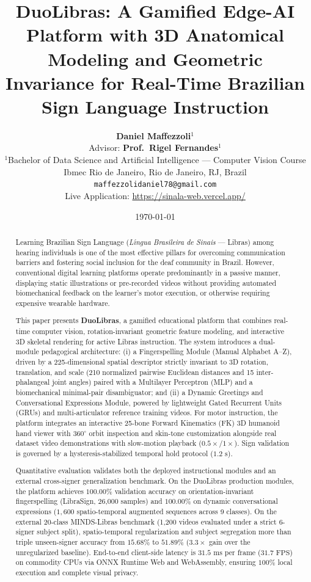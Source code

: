 \documentclass[12pt,a4paper]{article}
\title{%
\textbf{DuoLibras: A Gamified Edge-AI Platform with 3D Anatomical Modeling and Geometric Invariance for Real-Time Brazilian Sign Language Instruction}%
}
\author{%
    \textbf{Daniel Maffezzoli}$^{1}$ \\[0.3em]
    {\small Advisor: \textbf{Prof.\ Rigel Fernandes}$^{1}$} \\[0.8em]
    {\small $^{1}$Bachelor of Data Science and Artificial Intelligence --- Computer Vision Course} \\
    {\small Ibmec Rio de Janeiro, Rio de Janeiro, RJ, Brazil} \\[0.4em]
    {\small \texttt{maffezzolidaniel78@gmail.com}} \\[0.3em]
    {\small Live Application: \url{https://sinala-web.vercel.app/}}
}
\date{\today}
\begin{document}
\maketitle


\begin{abstract}
\noindent
Learning Brazilian Sign Language (\textit{L\'{\i}ngua Brasileira de Sinais} --- Libras) among hearing individuals is one of the most effective pillars for overcoming communication barriers and fostering social inclusion for the deaf community in Brazil. However, conventional digital learning platforms operate predominantly in a passive manner, displaying static illustrations or pre-recorded videos without providing automated biomechanical feedback on the learner's motor execution, or otherwise requiring expensive wearable hardware.

This paper presents \textbf{DuoLibras}, a gamified educational platform that combines real-time computer vision, rotation-invariant geometric feature modeling, and interactive 3D skeletal rendering for active Libras instruction. The system introduces a dual-module pedagogical architecture: (i) a Fingerspelling Module (Manual Alphabet A--Z), driven by a 225-dimensional spatial descriptor strictly invariant to 3D rotation, translation, and scale (210 normalized pairwise Euclidean distances and 15 inter-phalangeal joint angles) paired with a Multilayer Perceptron (MLP) and a biomechanical minimal-pair disambiguator; and (ii) a Dynamic Greetings and Conversational Expressions Module, powered by lightweight Gated Recurrent Units (GRUs) and multi-articulator reference training videos. For motor instruction, the platform integrates an interactive 25-bone Forward Kinematics (FK) 3D humanoid hand viewer with $360^\circ$ orbit inspection and skin-tone customization alongside real dataset video demonstrations with slow-motion playback ($0.5\times$/$1\times$). Sign validation is governed by a hysteresis-stabilized temporal hold protocol ($1.2\text{ s}$).

Quantitative evaluation validates both the deployed instructional modules and an external cross-signer generalization benchmark. On the DuoLibras production modules, the platform achieves $100.00\%$ validation accuracy on orientation-invariant fingerspelling (LibraSign, 26,000 samples) and $100.00\%$ on dynamic conversational expressions ($1{,}600$ spatio-temporal augmented sequences across 9 classes). On the external 20-class MINDS-Libras benchmark (1,200 videos evaluated under a strict 6-signer subject split), spatio-temporal regularization and subject segregation more than triple unseen-signer accuracy from $15.68\%$ to $51.89\%$ ($3.3\times$ gain over the unregularized baseline). End-to-end client-side latency is $31.5\text{ ms}$ per frame ($31.7\text{ FPS}$) on commodity CPUs via ONNX Runtime Web and WebAssembly, ensuring $100\%$ local execution and complete visual privacy.
\end{abstract}
\end{document}
